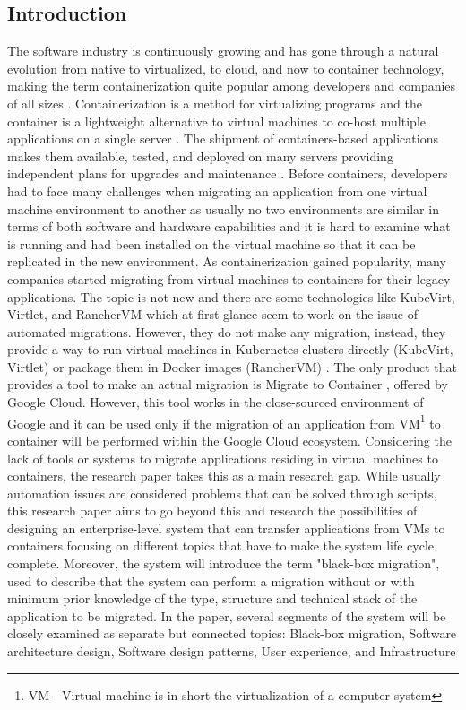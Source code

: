 \documentclass{article}
\begin{document}
\begin{multicols}{2}

\section{Introduction}
The software industry is continuously growing and has gone through a natural evolution from native to virtualized, to cloud, and now to container technology, making the term containerization quite popular among developers and companies of all sizes \cite{SiddiquiEtAl-2020}. Containerization is a method for virtualizing programs \cite{VermaEtAl-2022} and the container is a lightweight alternative to virtual machines to co-host multiple applications on a single server \cite{GargEtAl-2024}. The shipment of containers-based applications makes them available, tested, and deployed on many servers \cite{VermaEtAl-2022} providing independent plans for upgrades and maintenance \cite{SiddiquiEtAl-2020}. Before containers, developers had to face many challenges when migrating an application from one virtual machine environment to another as usually no two environments are similar in terms of both software and hardware capabilities \cite{SiddiquiEtAl-2020} and it is hard to examine what is running and had been installed on the virtual machine so that it can be replicated in the new environment. As containerization gained popularity, many companies started migrating from virtual machines to containers for their legacy applications. The topic is not new and there are some technologies like KubeVirt, Virtlet, and RancherVM which at first glance seem to work on the issue of automated migrations. However, they do not make any migration, instead, they provide a way to run virtual machines in Kubernetes clusters directly (KubeVirt, Virtlet)\cite{Sheldon-2022} or package them in Docker images (RancherVM) \cite{Baccini-2021}. The only product that provides a tool to make an actual migration is Migrate to Container \cite{Google-2024}, offered by Google Cloud. However, this tool works in the close-sourced environment of Google and it can be used only if the migration of an application from VM\footnote{VM - Virtual machine is in short the virtualization of a computer system} to container will be performed within the Google Cloud ecosystem. Considering the lack of tools or systems to migrate applications residing in virtual machines to containers, the research paper takes this as a main research gap. While usually automation issues are considered problems that can be solved through scripts, this research paper aims to go beyond this and research the possibilities of designing an enterprise-level system that can transfer applications from VMs to containers focusing on different topics that have to make the system life cycle complete. Moreover, the system will introduce the term "black-box migration", used to describe that the system can perform a migration without or with minimum prior knowledge of the type, structure and technical stack of the application to be migrated. In the paper, several segments of the system will be closely examined as separate but connected topics: Black-box migration, Software architecture design, Software design patterns, User experience, and Infrastructure 
\end{multicols}
\end{document}
